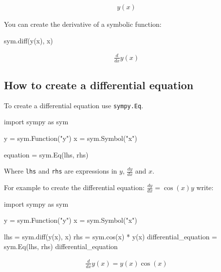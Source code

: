 \begin{equation*}
\begin{split}\displaystyle y{\left(x \right)}\end{split}
\end{equation*}




You can create the derivative of a symbolic function:




\begin{pyin}
sym.diff(y(x), x)
\end{pyin}




\begin{equation*}
\begin{split}\displaystyle \frac{d}{d x} y{\left(x \right)}\end{split}
\end{equation*}




\subsection{How to create a differential equation}
\label{\detokenize{tools-for-mathematics/09-differential-equations/how/main:how-to-create-a-differential-equation}}

To create a differential equation use \texttt{sympy.Eq}.


\begin{api}
import sympy as sym

y = sym.Function("y")
x = sym.Symbol("x")

equation = sym.Eq(lhs, rhs)
\end{api}



Where \texttt{lhs} and \texttt{rhs} are expressions in \(y\), \(\frac{dy}{dx}\) and \(x\).


For example to create the differential equation: \(\frac{dy}{dx} = \cos(x) y\)
write:




\begin{pyin}
import sympy as sym

y = sym.Function("y")
x = sym.Symbol("x")

lhs = sym.diff(y(x), x)
rhs = sym.cos(x) * y(x)
differential_equation = sym.Eq(lhs, rhs)
differential_equation
\end{pyin}




\begin{equation*}
\begin{split}\displaystyle \frac{d}{d x} y{\left(x \right)} = y{\left(x \right)} \cos{\left(x \right)}\end{split}
\end{equation*}




